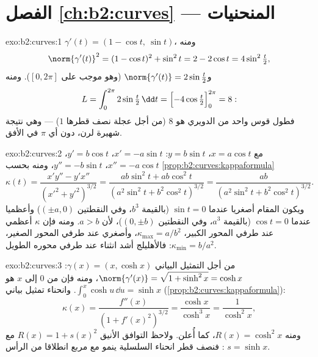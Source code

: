 \section*{الفصل \ref{ch:b2:curves} --- المنحنيات}

\begin{solution}{exo:b2:curves:1}
$\gamma'(t) = (1 - \cos t,\ \sin t)$، ومنه
\[
\norm{\gamma'(t)}^2 = (1 - \cos t)^2 + \sin^2 t
= 2 - 2\cos t = 4\sin^2\tfrac t2 ,
\]
و$\norm{\gamma'(t)} = 2\sin\frac t2$ (وهو موجب على $[0,
2\pi]$). ومنه
\[
L = \int_0^{2\pi} 2\sin\tfrac t2\,\dd t
= \Bigl[-4\cos\tfrac t2\Bigr]_0^{2\pi} = 8 :
\]
فطول قوس واحد من الدويري هو $8$ (من أجل عجلة نصف قطرها $1$) ---
وهي نتيجة شهيرة لرن، دون أي $\pi$ في الأفق.
\end{solution}

\begin{solution}{exo:b2:curves:2}
مع $x = a\cos t$، $y = b\sin t$: $x' = -a\sin t$، $y' = b\cos
t$، $x'' = -a\cos t$، $y'' = -b\sin t$، ومنه بحسب \cref{prop:b2:curves:kappaformula}
\[
\kappa(t)
= \frac{x'y'' - y'x''}{(x'^2 + y'^2)^{3/2}}
= \frac{ab\sin^2 t + ab\cos^2 t}
       {(a^2\sin^2 t + b^2\cos^2 t)^{3/2}}
= \frac{ab}{(a^2\sin^2 t + b^2\cos^2 t)^{3/2}} .
\]
ويكون المقام أصغريا عندما $\sin t = 0$ (بالقيمة $b^3$، وفي النقطتين
$(\pm a, 0)$) وأعظميا عندما $\cos t = 0$ (بالقيمة $a^3$، وفي النقطتين $(0, \pm b)$)،
لأن $a > b$. ومنه فإن $\kappa$ أعظمي عند طرفي المحور الكبير، $\kappa_{\max} = a/b^2$،
وأصغري عند طرفي المحور الصغير، $\kappa_{\min} = b/a^2$: فالأهليلج أشد انثناء عند
طرفي محوره الطويل.
\end{solution}

\begin{solution}{exo:b2:curves:3}
من أجل التمثيل البياني $\gamma(x) = (x, \cosh x)$: $\norm{\gamma'(x)} =
\sqrt{1 + \sinh^2 x} = \cosh x$، ومنه فإن  من $0$
إلى $x$ هو $\int_0^x \cosh u\,\dd u = \sinh x$. وانحناء تمثيل بياني (\cref{prop:b2:curves:kappaformula}):
\[
\kappa(x) = \frac{f''(x)}{(1 + f'(x)^2)^{3/2}}
= \frac{\cosh x}{\cosh^3 x} = \frac{1}{\cosh^2 x} ,
\]
ومنه $R(x) = \cosh^2 x$، كما أُعلن. ولاحظ التوافق الأنيق $R(x) = 1 + s(x)^2$ مع $s = \sinh x$ : فنصف قطر انحناء السلسلية ينمو مع مربع  انطلاقا من
الرأس.
\end{solution}

